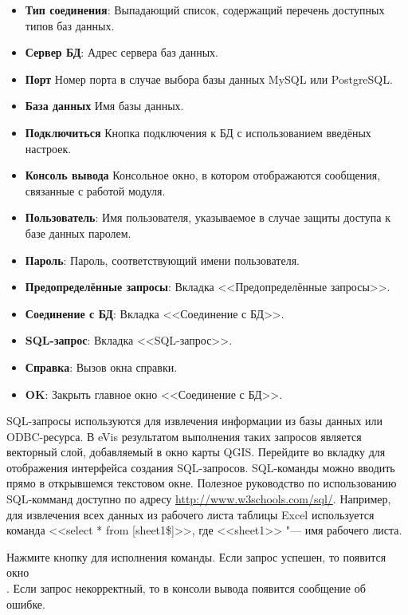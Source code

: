 \begin{itemize}[label=--]
\item \textbf{Тип соединения}: Выпадающий список, содержащий перечень
доступных типов баз данных.
\item \textbf{Сервер БД}: Адрес сервера баз данных.
\item \textbf{Порт} Номер порта в случае выбора базы данных MySQL или
PostgreSQL.
\item \textbf{База данных} Имя базы данных.
\item \textbf{Подключиться} Кнопка подключения к БД с использованием введёных
настроек.
\item \textbf{Консоль вывода} Консольное окно, в котором отображаются
сообщения, связанные с работой модуля.
\item \textbf{Пользователь}: Имя пользователя, указываемое в случае
защиты доступа к базе данных паролем.
\item \textbf{Пароль}: Пароль, соответствующий имени пользователя.
\item \textbf{Предопределённые запросы}: Вкладка <<Предопределённые запросы>>.
\item \textbf{Соединение с БД}: Вкладка <<Соединение с БД>>.
\item \textbf{SQL-запрос}: Вкладка <<SQL-запрос>>.
\item \textbf{Справка}: Вызов окна справки.
\item \textbf{OK}: Закрыть главное окно <<Соединение с БД>>.
\end{itemize}

\label{evis_running_sql}

SQL-запросы используются для извлечения информации из базы данных или
ODBC-ресурса. В eVis результатом выполнения таких запросов является векторный
слой, добавляемый в окно карты QGIS. Перейдите во вкладку 
для отображения интерфейса создания SQL-запросов. SQL-команды можно вводить
прямо в открывшемся текстовом окне. Полезное руководство по использованию
SQL-комманд доступно по адресу \url{http://www.w3schools.com/sql/}. Например,
для извлечения всех данных из рабочего листа таблицы Excel используется
команда <<select * from [sheet1\$]>>, где <<sheet1>> "--- имя рабочего листа.

Нажмите кнопку  для исполнения команды. Если запрос успешен,
то появится окно \\
. Если запрос некорректный, то 
в консоли вывода появится сообщение об ошибке.

